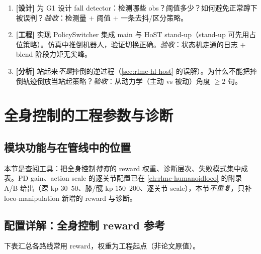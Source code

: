 \begin{practice}[本节动手]
\begin{enumerate}
  \item \textbf{[设计]} 为 G1 设计 fall detector：检测哪些 obs？阈值多少？如何避免正常蹲下被误判？\emph{验收}：检测量 $+$ 阈值 $+$ 一条去抖/区分策略。
  \item \textbf{[工程]} 实现 PolicySwitcher 集成 main 与 HoST stand-up（stand-up 可先用占位策略）。仿真中推倒机器人，验证切换正确。\emph{验收}：状态机走通的日志 $+$ blend 阶段力矩无尖峰。
  \item \textbf{[分析]} 站起来\emph{不是}摔倒的逆过程（\cref{sec:rlmc-hl-host} 的误解）。为什么不能把摔倒轨迹倒放当站起策略？\emph{验收}：从动力学（主动 vs 被动）角度 $\geq 2$ 句。
\end{enumerate}
\end{practice}

\section{全身控制的工程参数与诊断}\label{sec:rlmc-wbc-params}

\subsection{模块功能与在管线中的位置}
本节是查阅工具：把全身控制\emph{特有}的 reward 权重、诊断层次、失败模式集中成表。PD gain、action scale 的逐关节配置已在 \cref{ch:rlmc-humanoidloco} 的附录 A/B 给出（踝 kp $30$--$50$、膝/髋 kp $150$--$200$、逐关节 scale），本节\emph{不重复}，只补 loco-manipulation 新增的 reward 与诊断。

\subsection{配置详解：全身控制 reward 参考}
下表汇总各路线常用 reward，权重为工程起点（非论文原值）。

